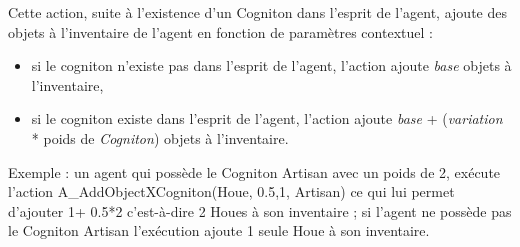 Cette action, suite à l'existence d'un Cogniton dans l'esprit de l'agent, ajoute  des objets à l'inventaire de l'agent en fonction de paramètres contextuel :
\begin{itemize}
\item  si le cogniton n'existe pas dans l'esprit de l'agent, l'action ajoute  \textit{base} objets à l'inventaire,
 \item si le cogniton existe dans l'esprit de l'agent, l'action ajoute \textit{base} + (\textit{variation} * poids de \textit{Cogniton}) objets à l'inventaire.
 \end{itemize}
	

Exemple  : un agent qui possède le Cogniton Artisan avec un poids de 2,  exécute l'action
A\_AddObjectXCogniton(Houe, 0.5,1, Artisan) ce qui lui permet d'ajouter 1+ 0.5*2 c'est-à-dire 2 Houes à son inventaire ; si l'agent ne possède pas le Cogniton Artisan l'exécution ajoute 1 seule Houe à son inventaire.
	
	